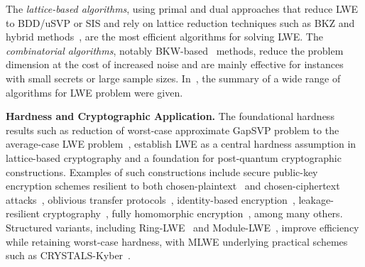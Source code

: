 The \emph{lattice-based algorithms}, 
using primal and dual approaches that reduce LWE to BDD/uSVP or SIS and rely on lattice reduction techniques such as BKZ and hybrid methods~\cite{EC:Albrecht17,EPRINT:AlbPlaSco15,RSA:LinPei11}, are the most efficient algorithms for solving LWE. The \emph{combinatorial algorithms}, notably BKW-based~\cite{DCC:ACFFP15} methods, reduce the problem dimension at the cost of increased noise and are mainly effective for instances with small secrets or large sample sizes. In~\cite{EPRINT:AlbPlaSco15}, the summary of a wide range of algorithms for LWE problem were given. 


\noindent
\textbf{Hardness and Cryptographic Application.}
The foundational hardness results such as reduction of worst-case approximate GapSVP problem to the average-case LWE problem~\cite{STOC:BLPRS13,DBLP:conf/stoc/Peikert09,STOC:Regev05,DBLP:journals/jacm/Regev09}, establish LWE as a central hardness assumption in lattice-based cryptography and a foundation for post-quantum cryptographic constructions.
Examples of such constructions include secure public-key encryption schemes resilient to both chosen-plaintext~\cite{RSA:LinPei11,DBLP:conf/crypto/PeikertVW08,STOC:Regev05} and chosen-ciphertext attacks~\cite{DBLP:conf/eurocrypt/MicciancioP12,DBLP:conf/stoc/Peikert09,DBLP:conf/stoc/PeikertW08}, oblivious transfer protocols~\cite{DBLP:conf/crypto/PeikertVW08}, identity-based encryption~\cite{DBLP:conf/eurocrypt/AgrawalBB10,DBLP:conf/crypto/AgrawalBB10,DBLP:conf/eurocrypt/CashHKP10,DBLP:conf/stoc/GentryPV08}, leakage-resilient cryptography~\cite{DBLP:conf/tcc/AkaviaGV09,DBLP:conf/crypto/ApplebaumCPS09,DBLP:conf/innovations/GoldwasserKPV10}, fully homomorphic encryption~\cite{DBLP:conf/crypto/Brakerski12,DBLP:conf/innovations/BrakerskiGV12,DBLP:conf/focs/BrakerskiV11}, among many others.
Structured variants, including Ring-LWE~\cite{EC:LyuPeiReg10} and Module-LWE~\cite{EPRINT:BraGenVai11}, improve efficiency while retaining worst-case hardness, with MLWE underlying practical schemes such as CRYSTALS-Kyber~\cite{NISTPQC:CRYSTALS-KYBER22}.


